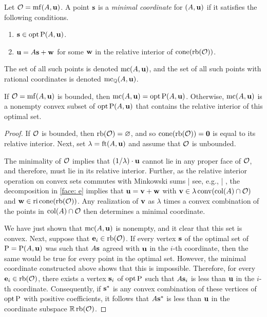 \documentclass[11pt]{amsart}
\renewcommand{\!}[1]{{\color{red}\text{$\star$\,}#1\,$\star$}}
\begin{document}
\begin{definition}
\label{mc: D} 
Let $\mathcal{O} = \operatorname{mf}(A, \mathbf{u})$.  A point $\mathbf{s}$ is a \emph{minimal coordinate} for $(A, \mathbf{u})$ if it satisfies the following conditions.
\begin{enumerate}
\item $\mathbf{s} \in \operatorname{opt} \mathrm{P}(A, \mathbf{u})$.
\item $\mathbf{u} = A \mathbf{s} + \mathbf{w}$ for some $\mathbf{w}$ in the relative interior of $\operatorname{cone} ( \operatorname{rb}(\mathcal{O}))$.  
\end{enumerate}

The set of all such points is denoted $\operatorname{mc}(A, \mathbf{u})$, and the set of all such points with rational coordinates is denoted $\operatorname{mc}_{\mathbb{Q}}(A, \mathbf{u})$.  
\end{definition}


\begin{proposition}  
\label{opt versus mc: P}  If $\mathcal{O} = \operatorname{mf}(A, \mathbf{u})$ is bounded, then $\operatorname{mc}(A, \mathbf{u}) = \operatorname{opt} \mathrm{P}(A, \mathbf{u})$.  Otherwise,  $\operatorname{mc}(A, \mathbf{u})$ is a nonempty convex subset of $\operatorname{opt} \mathrm{P}(A, \mathbf{u})$ that contains the relative interior of this optimal set. 
\end{proposition}

\begin{proof}    
If $\mathcal{O}$ is bounded, then $\operatorname{rb}(\mathcal{O}) = \varnothing$, and so $\operatorname{cone}( \operatorname{rb}(\mathcal{O})) = \mathbf{0}$ is equal to its relative interior.  Next, set $\lambda = \operatorname{ft}(A, \mathbf{u})$ and assume that $\mathcal{O}$ is unbounded.

 The minimality of $\mathcal{O}$ implies that $(1/\lambda)  \cdot \mathbf{u}$ cannot lie in any proper face of $\mathcal{O}$, and therefore, must lie in its relative interior.  Further, as the relative interior operation on convex sets commutes with Minkowski sums | see, e.g., \cite[Theorem 4.10(b)]{van-tiel.convex-analysis} | , the decomposition in \eqref{face: e}  implies that $\mathbf{u} = \mathbf{v} + \mathbf{w}$ with $\mathbf{v} \in \lambda \operatorname{conv}(\operatorname{col}(A) \cap \mathcal{O})$ and $\mathbf{w} \in \operatorname{ri} \operatorname{cone}(\operatorname{rb}(\mathcal{O}))$.  Any realization of $\mathbf{v}$ as $\lambda$ times a convex combination of the points in $\operatorname{col}(A) \cap \mathcal{O}$ then determines a minimal coordinate.

We have just shown that $\operatorname{mc}(A, \mathbf{u})$ is nonempty, and it clear that this set is convex.  Next,  suppose that $\mathbf{e}_i \in \operatorname{rb}(\mathcal{O})$.  If every vertex $\mathbf{s}$ of the optimal set of $\mathrm{P} = \mathrm{P}(A, \mathbf{u})$ was such that $A \mathbf{s}$ agreed with $\mathbf{u}$ in the $i$-th coordinate, then the same would be true for every point in the optimal set.   However, the minimal coordinate constructed above shows that this is impossible.  Therefore, for every $\mathbf{e}_i \in \operatorname{rb}(\mathcal{O})$, there exists a vertex $\mathbf{s}_i$ of $\operatorname{opt} \mathrm{P}$ such that $A \mathbf{s}_i$ is less than $\mathbf{u}$ in the $i$-th coordinate.  Consequently, if $\mathbf{s}^{\ast}$ is any convex combination of these vertices of $\operatorname{opt} \mathrm{P}$ with positive coefficients, it follows that $A \mathbf{s}^{\ast}$ is less than $\mathbf{u}$ in the coordinate subspace $\mathbb{R} \operatorname{rb}(\mathcal{O})$.  
\end{proof}
\end{document}
